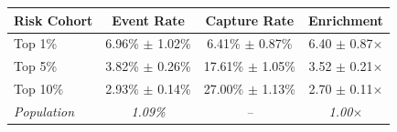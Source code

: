 \begin{tabular}{@{}lccc@{}}
\toprule
\textbf{Risk Cohort} & \textbf{Event Rate} & \textbf{Capture Rate} & \textbf{Enrichment} \\
\midrule
Top 1\% & 6.96\% $\pm$ 1.02\% & 6.41\% $\pm$ 0.87\% & 6.40 $\pm$ 0.87$\times$ \\
Top 5\% & 3.82\% $\pm$ 0.26\% & 17.61\% $\pm$ 1.05\% & 3.52 $\pm$ 0.21$\times$ \\
Top 10\% & 2.93\% $\pm$ 0.14\% & 27.00\% $\pm$ 1.13\% & 2.70 $\pm$ 0.11$\times$ \\
\midrule
\textit{Population} & \textit{1.09\%} & \textit{--} & \textit{1.00$\times$} \\
\bottomrule
\end{tabular}
